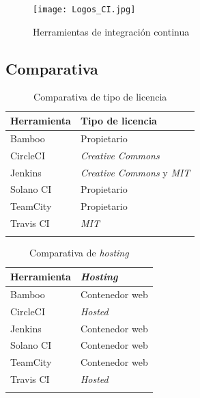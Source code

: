 \begin{figure}[!h]
\centering
   \texttt{[image: Logos\_CI.jpg]}
\caption{Herramientas de integración continua}
\end{figure}


\subsection{Comparativa}

\begin{center}
\begin{longtable}{p{} p{}}
\hline \hline
  \textbf{Herramienta} & \textbf{Tipo de licencia} \\
    \hline \hline
    Bamboo & Propietario\\
    \hline\hline
    CircleCI & \textit{Creative Commons}\\
    \hline\hline
    Jenkins & \textit{Creative Commons} y \textit{MIT}\\
    \hline\hline
    Solano CI & Propietario\\
    \hline\hline
    TeamCity & Propietario\\
    \hline\hline
    Travis CI & \textit{MIT}\\
    \hline\hline    
    
\caption{Comparativa de tipo de licencia}
\end{longtable}
\end{center}

\clearpage

\begin{center}
\begin{longtable}{p{} p{}}
\hline \hline
  \textbf{Herramienta} & \textbf{\textit{Hosting}} \\
    \hline \hline
    Bamboo & Contenedor web\\
    \hline\hline
    CircleCI & \textit{Hosted}\\
    \hline\hline
    Jenkins & Contenedor web\\
    \hline\hline
      Solano CI & Contenedor web\\
    \hline\hline
    TeamCity & Contenedor web\\
    \hline\hline
    Travis CI & \textit{Hosted}\\
    \hline\hline    
    
\caption{Comparativa de \textit{hosting}}
\end{longtable}
\end{center}

